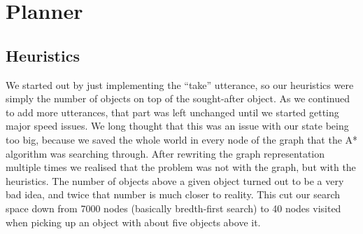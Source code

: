 \section*{Planner}

\subsection*{Heuristics}
We started out by just implementing the ``take'' utterance, so our heuristics
were simply the number of objects on top of the sought-after object. As we
continued to add more utterances, that part was left unchanged until we started
getting major speed issues. We long thought that this was an issue with our
state being too big, because we saved the whole world in every node of the
graph that the A* algorithm was searching through. After rewriting the graph
representation multiple times we realised that the problem was not with the
graph, but with the heuristics. The number of objects above a given object
turned out to be a very bad idea, and twice that number is much closer to
reality. This cut our search space down from 7000 nodes (basically bredth-first
search) to 40 nodes visited when picking up an object with about five objects
above it.

